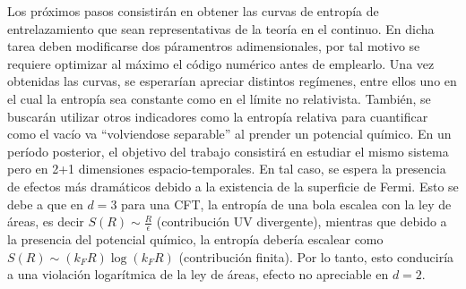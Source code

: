 Los próximos pasos consistirán en obtener las curvas de entropía de entrelazamiento que sean representativas de la teoría en el continuo. En dicha tarea deben modificarse dos páramentros adimensionales, por tal motivo se requiere optimizar al máximo el código numérico  antes de emplearlo. Una vez obtenidas las curvas, se esperarían apreciar distintos regímenes, entre ellos uno en el cual la entropía sea constante como en el límite no relativista. También, se buscarán utilizar otros indicadores como la entropía relativa para cuantificar como el vacío va “volviendose separable” al prender un potencial químico. En un período posterior, el objetivo del trabajo consistirá en estudiar el mismo sistema pero en 2+1 dimensiones espacio-temporales. En tal caso, se espera la presencia de efectos más dramáticos debido a la existencia de la superficie de Fermi. Esto se debe a que en $d=3$ para una CFT, la entropía de una bola escalea con la ley de áreas, es decir $S(R)\sim \frac{R}{\epsilon}$ (contribución UV divergente), mientras que debido a la presencia del potencial químico, la entropía debería escalear como $S(R)\sim (k_F R) \log(k_F R)$ (contribución finita). Por lo tanto, esto conduciría a una violación logarítmica de la ley de áreas, efecto no apreciable en $d=2$.


